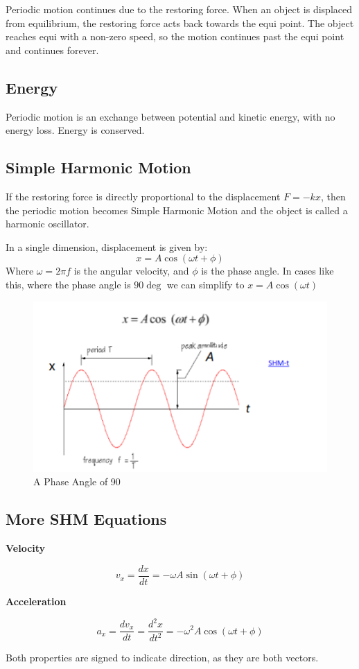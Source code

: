 Periodic motion continues due to the restoring force. When an object is displaced from equilibrium, the restoring force acts back towards the equi point. The object reaches equi with a non-zero speed, so the motion continues past the equi point and continues forever.

\subsection*{Energy}
Periodic motion is an exchange between potential and kinetic energy, with no energy loss. Energy is conserved.

\subsection*{Simple Harmonic Motion}
If the restoring force is directly proportional to the displacement $F = -kx$, then the periodic motion becomes Simple Harmonic Motion and the object is called a harmonic oscillator.

In a single dimension, displacement is given by:
\[
    x = A \cos(\omega t + \phi)
\]
Where $\omega = 2 \pi f$ is the angular velocity, and $\phi$ is the phase angle. In cases like this, where the phase angle is $90 \deg$ we can simplify to $x = A \cos(\omega t)$
\begin{figure}[H]
    \centering
    \includegraphics{figures/phaseangle.png}
    \caption{A Phase Angle of 90}
\end{figure}

\subsection*{More SHM Equations}
\textbf{Velocity}

\[
    v_x = \frac{dx}{dt} = - \omega A \sin(\omega t + \phi)
\]

\textbf{Acceleration}

\[
    a_x = \frac{d v_x}{dt} = \frac{d^2 x}{dt^2} = - \omega^2 A \cos(\omega t + \phi)
\]

Both properties are signed to indicate direction, as they are both vectors.



